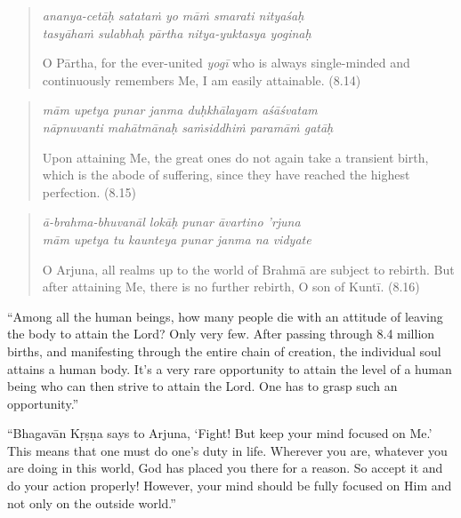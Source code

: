 \documentclass[12pt, twoside, openright]{memoir}
\begin{document}
\par
\begin{verse}
\textit{ananya-cetāḥ satataṁ yo māṁ smarati nityaśaḥ} \\
\textit{tasyāhaṁ sulabhaḥ pārtha nitya-yuktasya yoginaḥ}

\noindent O Pārtha, for the ever-united \textit{yogī} who is always single-minded and continuously remembers Me, I am easily attainable. (8.14)
\end{verse}
\par



\par
\begin{verse}
\textit{mām upetya punar janma duḥkhālayam aśāśvatam} \\
\textit{nāpnuvanti mahātmānaḥ saṁsiddhiṁ paramāṁ gatāḥ}

\noindent Upon attaining Me, the great ones do not again take a transient birth, which is the abode of suffering, since they have reached the highest perfection. (8.15)
\end{verse}
\par



\par
\begin{verse}
\textit{ā-brahma-bhuvanāl lokāḥ punar āvartino ’rjuna} \\
\textit{mām upetya tu kaunteya punar janma na vidyate}

\noindent O Arjuna, all realms up to the world of Brahmā are subject to rebirth. But after attaining Me, there is no further rebirth, O son of Kuntī. (8.16)
\end{verse}
\par


\enquote{Among all the human beings, how many people die with an attitude of leaving the body to attain the Lord? Only very few. After passing through 8.4 million births, and manifesting through the entire chain of creation, the individual soul attains a human body. It’s a very rare opportunity to attain the level of a human being who can then strive to attain the Lord. One has to grasp such an opportunity.}

\enquote{Bhagavān Kṛṣṇa says to Arjuna, \enquote{Fight! But keep your mind focused on Me.} This means that one must do one’s duty in life. Wherever you are, whatever you are doing in this world, God has placed you there for a reason. So accept it and do your action properly! However, your mind should be fully focused on Him and not only on the outside world.}
\end{document}

